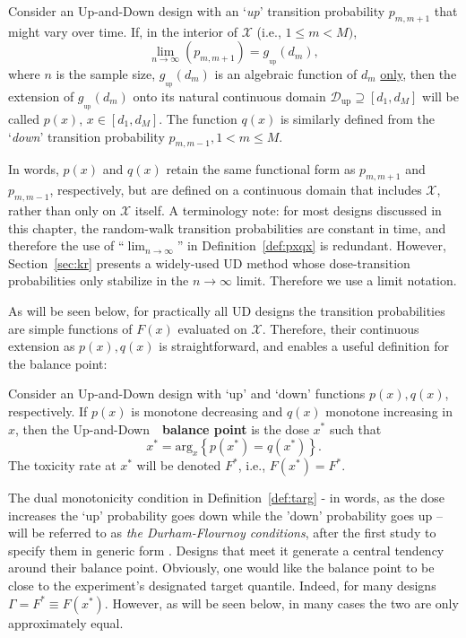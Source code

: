 \begin{defn}\label{def:pxqx}
Consider an Up-and-Down design with an `\emph{up}' transition probability  $p_{m,m+1}$ that might vary over time. If, in the interior of $\mathcal{X}$ (i.e., $1\leq m<M)$, $$\lim_{n\to\infty}\left(p_{m,m+1}\right)=g_{_\mathrm{up}}\left(d_m\right),$$
where $n$ is the sample size, $g_{_\mathrm{up}}\left(d_m\right)$ is an algebraic function of $d_m$  \underline{only}, then the extension of $g_{_\mathrm{up}}\left(d_m\right)$ onto its natural continuous domain $\mathcal{D}{_\mathrm{up}}\supseteq\left[d_1,d_M\right]$ will be called $p(x)$, $x\in\left[d_1,d_M\right]$. The function $q(x)$ is similarly defined from the `\emph{down}' transition probability $p_{m,m-1}, 1<m\leq M$.
\end{defn}

In words, $p(x)$ and $q(x)$ retain the same functional form as $p_{m,m+1}$ and $p_{m,m-1}$, respectively, but are defined on a continuous domain that includes $\mathcal{X}$, rather than only on $\mathcal{X}$ itself. A terminology note: for most designs discussed in this chapter, the random-walk transition probabilities are constant in time, and therefore the use of ``$\lim_{n\to\infty}$'' in Definition~\ref{def:pxqx} is redundant. However, Section~\ref{sec:kr} presents a widely-used UD method whose dose-transition probabilities only stabilize in the $n\to\infty$ limit. Therefore we use a limit notation.

As will be seen below, for practically all UD designs the transition probabilities are simple functions of $F(x)$ evaluated on $\mathcal{X}$. Therefore, their continuous extension as $p(x),q(x)$ is straightforward, and enables a useful definition for the balance point:

\begin{defn}\label{def:targ}  Consider an Up-and-Down design with `up' and `down' functions $p(x),q(x)$, respectively. If $p(x)$ is monotone decreasing and $q(x)$ monotone increasing in $x$,
then the Up-and-Down\ \  {\bf balance point} is the dose $x^*$ such that
\begin{equation}\label{eq:deftarget}
x^*=\mathrm{arg}_x \left\{p(x^*)=q(x^*)\right\}.
\end{equation}
The toxicity rate at $x^*$ will be denoted $F^*$, i.e., $F(x^*)=F^*$.
\end{defn}

The dual monotonicity condition in Definition~\ref{def:targ} - in words, as the dose increases the `up' probability goes down while the 'down' probability goes up --  will be referred to as \emph{the Durham-Flournoy conditions}, after the first study to specify them in generic form \citep{Durh:Flou:up-a:1995}. Designs that meet it generate a central tendency around their balance point. Obviously, one would like the balance point to be close to the experiment's designated target quantile. Indeed, for many designs \  $\Gamma=F^*\equiv F(x^*)$. However, as will be seen below, in many cases the two are only approximately equal.

